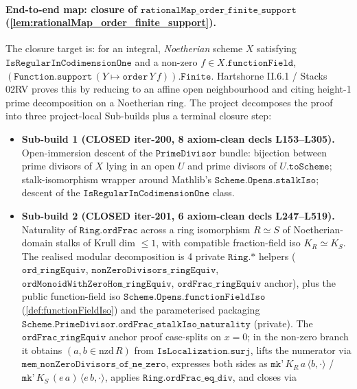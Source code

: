 \paragraph{End-to-end map: closure of
\(\texttt{rationalMap\_order\_finite\_support}\) (\ref{lem:rationalMap_order_finite_support}).}
The closure target is: for an integral, \emph{Noetherian} scheme
\(X\) satisfying \(\texttt{IsRegularInCodimensionOne}\) and a non-zero
\(f \in X.\texttt{functionField}\),
\((\texttt{Function.support}\,(Y \mapsto \texttt{order}\,Y\,f)).\texttt{Finite}\).
Hartshorne II.6.1 / Stacks 02RV proves this by reducing to an
affine open neighbourhood and citing height-1 prime decomposition
on a Noetherian ring. The project decomposes the proof into three
project-local Sub-builds plus a terminal closure step:

\begin{itemize}
  \item \textbf{Sub-build 1 (CLOSED iter-200, 8 axiom-clean decls
    L153--L305).} Open-immersion descent of the
    \(\texttt{PrimeDivisor}\) bundle: bijection between
    prime divisors of \(X\) lying in an open \(U\) and prime divisors
    of \(U.\texttt{toScheme}\); stalk-isomorphism wrapper around
    Mathlib's \(\texttt{Scheme.Opens.stalkIso}\); descent of the
    \(\texttt{IsRegularInCodimensionOne}\) class.
  \item \textbf{Sub-build 2 (CLOSED iter-201, 6 axiom-clean decls
    L247--L519).} Naturality of \(\texttt{Ring.ordFrac}\) across a
    ring isomorphism \(R \simeq S\) of Noetherian-domain stalks of
    Krull dim \(\leq 1\), with compatible fraction-field iso
    \(K_R \simeq K_S\). The realised modular decomposition is
    4 private \(\texttt{Ring.*}\) helpers
    (\(\texttt{ord\_ringEquiv}\),
     \(\texttt{nonZeroDivisors\_ringEquiv}\),
     \(\texttt{ordMonoidWithZeroHom\_ringEquiv}\),
     \(\texttt{ordFrac\_ringEquiv}\) anchor), plus the public
    function-field iso \(\texttt{Scheme.Opens.functionFieldIso}\)
    (\ref{def:functionFieldIso}) and the parameterised packaging
    \(\texttt{Scheme.PrimeDivisor.ordFrac\_stalkIso\_naturality}\)
    (private). The \(\texttt{ordFrac\_ringEquiv}\) anchor proof
    case-splits on \(x = 0\); in the non-zero branch it obtains
    \((a, b \in \mathrm{nzd}\,R)\) from
    \(\texttt{IsLocalization.surj}\), lifts the numerator via
    \(\texttt{mem\_nonZeroDivisors\_of\_ne\_zero}\), expresses both
    sides as \(\texttt{mk'}\,K_R\,a\,\langle b, \cdot\rangle\) /
    \(\texttt{mk'}\,K_S\,(e\,a)\,\langle e\,b, \cdot\rangle\), applies
    \(\texttt{Ring.ordFrac\_eq\_div}\), and closes via

\end{itemize}
